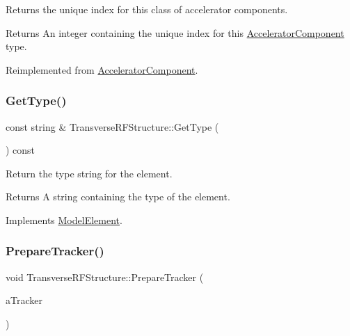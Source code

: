 Returns the unique index for this class of accelerator components. \begin{DoxyReturn}{Returns}
An integer containing the unique index for this \hyperlink{classAcceleratorComponent}{Accelerator\+Component} type. 
\end{DoxyReturn}


Reimplemented from \hyperlink{classAcceleratorComponent_abd1490171ac9af6004d3da01fb3b95fb}{Accelerator\+Component}.

\mbox{\label{classTransverseRFStructure_a3dbe71ac560ebc89a02d869d3dd7999d}} 
\subsubsection{\texorpdfstring{Get\+Type()}{GetType()}}
{\footnotesize\ttfamily const string \& Transverse\+R\+F\+Structure\+::\+Get\+Type (\begin{DoxyParamCaption}{ }\end{DoxyParamCaption}) const\hspace{0.3cm}{\ttfamily [virtual]}}

Return the type string for the element. \begin{DoxyReturn}{Returns}
A string containing the type of the element. 
\end{DoxyReturn}


Implements \hyperlink{classModelElement_a04dc2e51e1999fca612eb1838ec6b271}{Model\+Element}.

\mbox{\label{classTransverseRFStructure_aa06fabec5aff45f5ac71c5a29f70ca3c}} 
\subsubsection{\texorpdfstring{Prepare\+Tracker()}{PrepareTracker()}}
{\footnotesize\ttfamily void Transverse\+R\+F\+Structure\+::\+Prepare\+Tracker (\begin{DoxyParamCaption}\item[{\hyperlink{classComponentTracker}{Component\+Tracker} \&}]{a\+Tracker }\end{DoxyParamCaption})\hspace{0.3cm}{\ttfamily [virtual]}}

